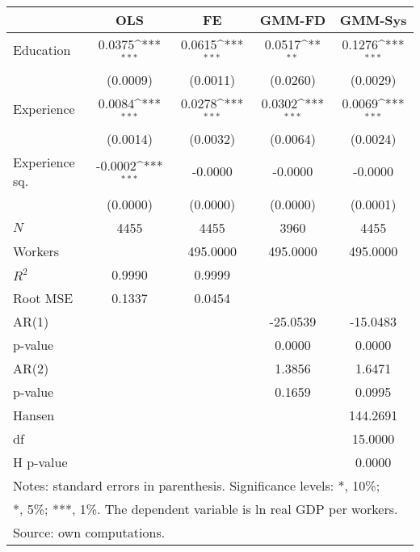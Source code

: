 {
\def\sym#1{\ifmmode^{#1}\else\(^{#1}\)\fi}
\begin{tabular}{l*{4}{c}}
\hline\hline
            &\multicolumn{1}{c}{OLS}&\multicolumn{1}{c}{FE}&\multicolumn{1}{c}{GMM-FD}&\multicolumn{1}{c}{GMM-Sys}\\
\hline
Education   &      0.0375\sym{***}&      0.0615\sym{***}&      0.0517\sym{**} &      0.1276\sym{***}\\
            &    (0.0009)         &    (0.0011)         &    (0.0260)         &    (0.0029)         \\
[1em]
Experience  &      0.0084\sym{***}&      0.0278\sym{***}&      0.0302\sym{***}&      0.0069\sym{***}\\
            &    (0.0014)         &    (0.0032)         &    (0.0064)         &    (0.0024)         \\
[1em]
Experience sq.&     -0.0002\sym{***}&     -0.0000         &     -0.0000         &     -0.0000         \\
            &    (0.0000)         &    (0.0000)         &    (0.0000)         &    (0.0001)         \\
\hline
\(N\)       &        4455         &        4455         &        3960         &        4455         \\
Workers     &                     &    495.0000         &    495.0000         &    495.0000         \\
$R^{2}$     &      0.9990         &      0.9999         &                     &                     \\
Root MSE    &      0.1337         &      0.0454         &                     &                     \\
AR(1)       &                     &                     &    -25.0539         &    -15.0483         \\
p-value     &                     &                     &      0.0000         &      0.0000         \\
AR(2)       &                     &                     &      1.3856         &      1.6471         \\
p-value     &                     &                     &      0.1659         &      0.0995         \\
Hansen      &                     &                     &                     &    144.2691         \\
df          &                     &                     &                     &     15.0000         \\
H p-value   &                     &                     &                     &      0.0000         \\
\hline\hline
\multicolumn{5}{l}{\footnotesize Notes: standard errors in parenthesis. Significance levels: *, 10\%;}\\
\multicolumn{5}{l}{\footnotesize **, 5\%; ***, 1\%. The dependent variable is ln real GDP per workers.}\\
\multicolumn{5}{l}{\footnotesize Source: own computations.}\\
\end{tabular}
}
